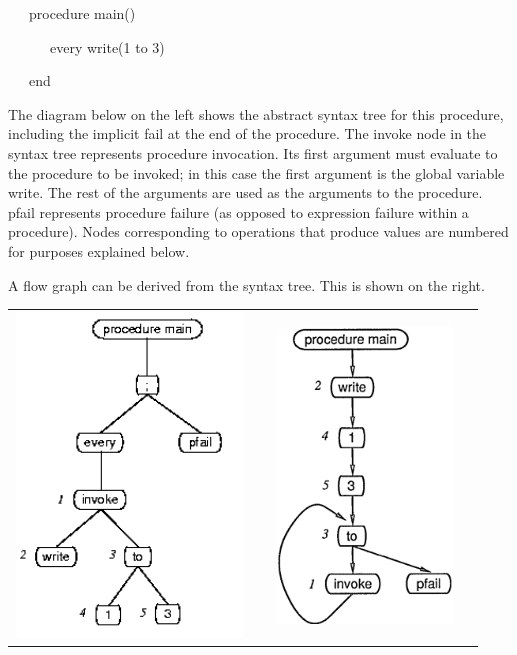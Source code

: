 {\ttfamily\mdseries
\ \ \ procedure main()}

{\ttfamily\mdseries
\ \ \ \ \ \ every write(1 to 3)}

{\ttfamily\mdseries
\ \ \ end}


The diagram below on the left shows the abstract syntax tree for this
procedure, including the implicit fail at the end of the
procedure. The invoke node in the syntax tree represents procedure
invocation. Its first argument must evaluate to the procedure to be
invoked; in this case the first argument is the global variable
write. The rest of the arguments are used as the arguments to the
procedure. pfail represents procedure failure (as opposed to
expression failure within a procedure). Nodes corresponding to
operations that produce values are numbered for purposes explained
below.

A flow graph can be derived from the syntax tree. This is shown on the right. 

\begin{flushleft}
\tablefirsthead{}
\tablehead{}
\tabletail{}
\tablelasttail{}
\begin{xtabular}{m{2.49766in}m{3.3448598in}}

\includegraphics[width=2.4in,height=3.4in]{kw/figure3-1.png}   &
\includegraphics[width=2.2in,height=3.1in]{kw/figure3-2.png}  \\
\end{xtabular}
\end{flushleft}


